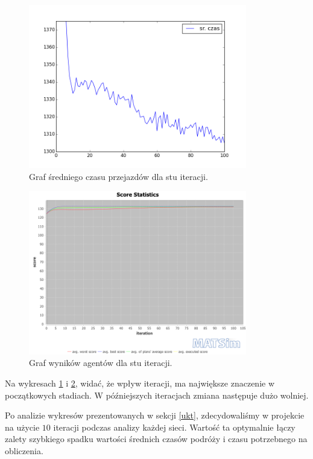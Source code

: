 \documentclass[twoside,12pt]{report}
\begin{document}
\begin{figure}[!htb]
\centering
\includegraphics[width=0.85\textwidth]{img/def_iters}
\caption{Graf średniego czasu przejazdów dla stu iteracji.}
\label{def_iters}
\end{figure}

\begin{figure}[!htb]
\centering
\includegraphics[width=0.85\textwidth]{img/def_scorestats}
\caption{Graf wyników agentów dla stu iteracji.}
\label{def_scorestats}
\end{figure}

Na wykresach \ref{def_iters} i \ref{def_scorestats}, widać, że wpływ iteracji, ma największe znaczenie w początkowych stadiach. W późniejszych iteracjach zmiana następuje dużo wolniej.

Po analizie wykresów prezentowanych w sekcji \ref{ukt}, zdecydowaliśmy w projekcie na użycie $10$ iteracji podczas analizy każdej sieci. Wartość ta optymalnie łączy zalety szybkiego spadku wartości średnich czasów podróży i czasu potrzebnego na obliczenia.
\end{document}
